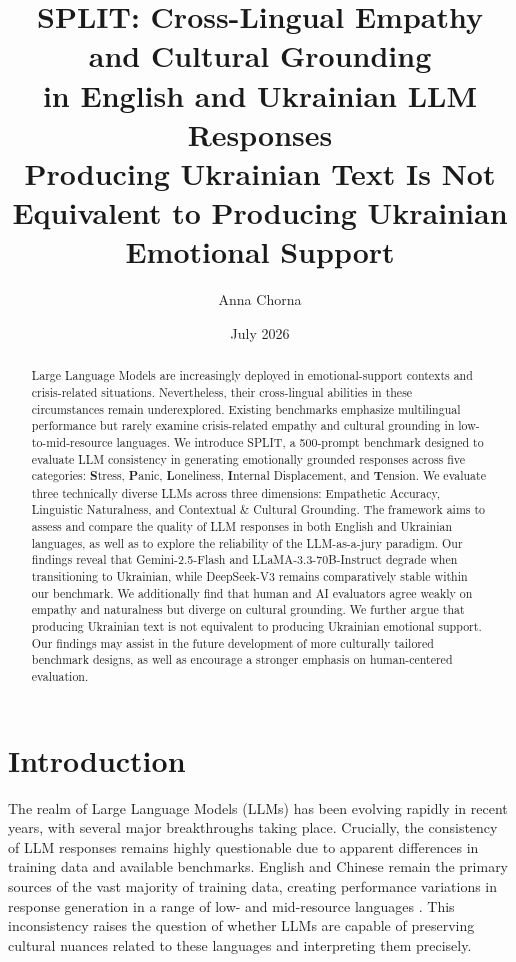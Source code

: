 \documentclass[10pt, twocolumn]{article}
\title{
SPLIT: Cross-Lingual Empathy and Cultural Grounding\\
in English and Ukrainian LLM Responses\\[0.7em]
\normalsize
{Producing Ukrainian Text Is Not Equivalent to Producing Ukrainian Emotional Support}
}
\author{Anna Chorna}
\date{July 2026}
\begin{document}
\maketitle

\begin{abstract}
Large Language Models are increasingly deployed in emotional-support contexts and crisis-related situations. Nevertheless, their cross-lingual abilities in these circumstances remain underexplored. Existing benchmarks emphasize multilingual performance but rarely examine crisis-related empathy and cultural grounding in low-to-mid-resource languages. We introduce SPLIT, a 500-prompt benchmark designed to evaluate LLM consistency in generating emotionally grounded responses across five categories: \textbf{S}tress, \textbf{P}anic, \textbf{L}oneliness, \textbf{I}nternal Displacement, and \textbf{T}ension. We evaluate three technically diverse LLMs across three dimensions: Empathetic Accuracy, Linguistic Naturalness, and Contextual \& Cultural Grounding. The framework aims to assess and compare the quality of LLM responses in both English and Ukrainian languages, as well as to explore the reliability of the LLM-as-a-jury paradigm. Our findings reveal that Gemini-2.5-Flash and LLaMA-3.3-70B-Instruct degrade when transitioning to Ukrainian, while DeepSeek-V3 remains comparatively stable within our benchmark. We additionally find that human and AI evaluators agree weakly on empathy and naturalness but diverge on cultural grounding. We further argue that producing Ukrainian text is not equivalent to producing Ukrainian emotional support. Our findings may assist in the future development of more culturally tailored benchmark designs, as well as encourage a stronger emphasis on human-centered evaluation.
\end{abstract}



\section{Introduction}

The realm of Large Language Models (LLMs) has been evolving rapidly in recent years, with several major breakthroughs \cite{vaswani2017attention, brown2020language} taking place. 
Crucially, the consistency of LLM responses remains highly questionable \cite{xing2024evaluating} due to apparent differences in training data and available benchmarks. English and Chinese remain the primary sources of the vast majority of training data, creating performance variations in response generation in a range of low- and mid-resource languages \cite{lim2025understanding}. This inconsistency raises the question of whether LLMs are capable of preserving cultural nuances related to these languages \cite{rystrom2025multilingual} and interpreting them precisely. 
\end{document}
